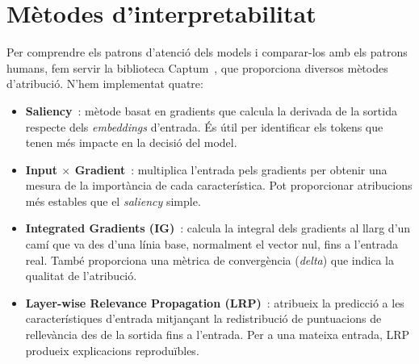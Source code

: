 \section{Mètodes d'interpretabilitat}\label{sec:metodes}

Per comprendre els patrons d'atenció dels models i comparar-los amb els patrons humans, fem servir la biblioteca Captum~\cite{captum}, que proporciona diversos mètodes d'atribució.
N'hem implementat quatre:

\begin{itemize}
    \item \textbf{Saliency}~\cite{simonyan2013deep}: mètode basat en gradients que calcula la derivada de la sortida respecte dels \textit{embeddings} d'entrada. És útil per identificar els tokens que tenen més impacte en la decisió del model.
    \item \textbf{Input $\times$ Gradient}~\cite{shrikumar2016not}: multiplica l'entrada pels gradients per obtenir una mesura de la importància de cada característica. Pot proporcionar atribucions més estables que el \textit{saliency} simple.
    \item \textbf{Integrated Gradients (IG)}~\cite{sundararajan2017axiomatic}: calcula la integral dels gradients al llarg d'un camí que va des d'una línia base, normalment el vector nul, fins a l'entrada real.
    També proporciona una mètrica de convergència (\textit{delta}) que indica la qualitat de l'atribució.
    \item \textbf{Layer-wise Relevance Propagation (LRP)}~\cite{LRP}: atribueix la predicció a les característiques d'entrada mitjançant la redistribució de puntuacions de rellevància des de la sortida fins a l'entrada.
    Per a una mateixa entrada, LRP produeix explicacions reproduïbles.
\end{itemize}

%
%
%

